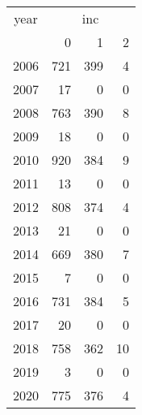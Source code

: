 \footnotesize\begin{tabular}[t]{lrrr}
\toprule
\multicolumn{1}{c}{year} & \multicolumn{3}{c}{inc} \\
\cmidrule(l{3pt}r{3pt}){1-1} \cmidrule(l{3pt}r{3pt}){2-4}
  & 0 & 1 & 2\\
\midrule
2006 & 721 & 399 & 4\\
2007 & 17 & 0 & 0\\
2008 & 763 & 390 & 8\\
2009 & 18 & 0 & 0\\
2010 & 920 & 384 & 9\\
2011 & 13 & 0 & 0\\
2012 & 808 & 374 & 4\\
2013 & 21 & 0 & 0\\
2014 & 669 & 380 & 7\\
2015 & 7 & 0 & 0\\
2016 & 731 & 384 & 5\\
2017 & 20 & 0 & 0\\
2018 & 758 & 362 & 10\\
2019 & 3 & 0 & 0\\
2020 & 775 & 376 & 4\\
\bottomrule
\end{tabular}
